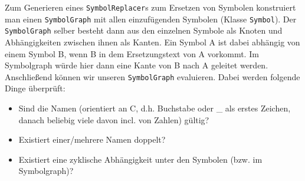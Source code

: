 Zum Generieren eines \texttt{SymbolReplacer}s zum Ersetzen von Symbolen
konstruiert man einen \texttt{SymbolGraph} mit allen einzufügenden Symbolen
(Klasse \texttt{Symbol}). Der \texttt{SymbolGraph} selber besteht dann aus den
einzelnen Symbole als Knoten und Abhängigkeiten zwischen ihnen als Kanten. Ein
Symbol A ist dabei abhängig von einem Symbol B, wenn B in dem Ersetzungstext von
A vorkommt. Im Symbolgraph würde hier dann eine Kante von B nach A geleitet
werden. Anschließend können wir unseren \texttt{SymbolGraph} evaluieren. Dabei
werden folgende Dinge überprüft: \begin {itemize} \item Sind die Namen
(orientiert an C, d.h. Buchstabe oder _ als erstes Zeichen, danach beliebig
viele davon incl. von Zahlen) gültig? \item Existiert einer/mehrere Namen
doppelt? \item Existiert eine zyklische Abhängigkeit unter den Symbolen (bzw. im
Symbolgraph)? \end {itemize}

